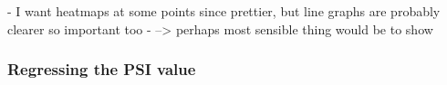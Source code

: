 

- I want heatmaps at some points since prettier, but line graphs are probably clearer so important too
- 
--> perhaps most sensible thing would be to show


%


\subsubsection{Regressing the PSI value} \label{subsubsec:psi_regression}




